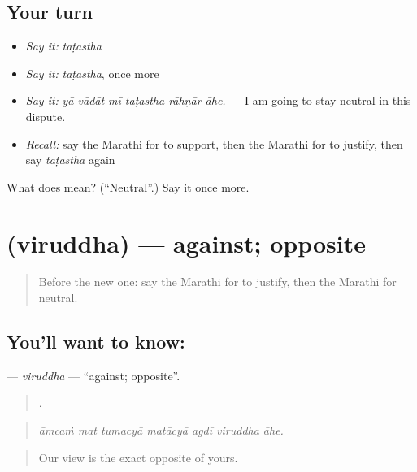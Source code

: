 \subsection*{Your turn}
\begin{itemize}
\raggedright
  \item \emph{Say it:} \emph{taṭastha}
  \item \emph{Say it:} \emph{taṭastha}, once more
  \item \emph{Say it:} \emph{yā vādāt mī taṭastha rāhṇār āhe.} — I am going to stay neutral in this dispute.
  \item \emph{Recall:} say the Marathi for to support, then the Marathi for to justify, then say \emph{taṭastha} again
\end{itemize}

\begin{tcolorbox}[breakable,colback=teal!4,colframe=teal!35!black,title={Before you move on}]
What does  mean? (\textquotedblleft{}Neutral\textquotedblright{}.) Say it once more.
\end{tcolorbox}
\section[\texorpdfstring{\mr{विरुद्ध} (viruddha)}{विरुद्ध (viruddha)}]{ (viruddha) — against; opposite}

\label{lesson:MR-C347-viruddha}



\begin{quote}
Before the new one: say the Marathi for to justify, then the Marathi for neutral.
\end{quote}

\subsection*{You'll want to know: }
\textbf{} — \emph{viruddha} — \textquotedblleft{}against; opposite\textquotedblright{}.

\begin{quote}
      .
\end{quote}

\begin{quote}
\emph{āmcaṁ mat tumacyā matācyā agdī viruddha āhe.}
\end{quote}

\begin{quote}
Our view is the exact opposite of yours.
\end{quote}

